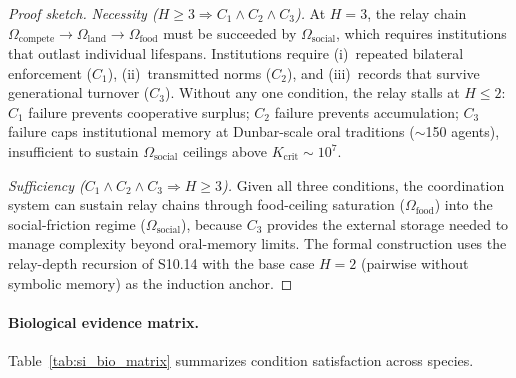 \documentclass[11pt]{article}
\begin{document}
\begin{proof}[Proof sketch]
\emph{Necessity ($H\ge 3 \Rightarrow C_1 \wedge C_2 \wedge C_3$).}
At $H=3$, the relay chain $\Omega_{\mathrm{compete}}\to\Omega_{\mathrm{land}}\to\Omega_{\mathrm{food}}$ must be succeeded by $\Omega_{\mathrm{social}}$, which requires institutions that outlast individual lifespans.
Institutions require (i)~repeated bilateral enforcement ($C_1$), (ii)~transmitted norms ($C_2$), and (iii)~records that survive generational turnover ($C_3$).
Without any one condition, the relay stalls at $H\le 2$: $C_1$ failure prevents cooperative surplus; $C_2$ failure prevents accumulation; $C_3$ failure caps institutional memory at Dunbar-scale oral traditions ($\sim$150 agents), insufficient to sustain $\Omega_{\mathrm{social}}$ ceilings above $K_{\mathrm{crit}}\sim 10^7$.

\emph{Sufficiency ($C_1 \wedge C_2 \wedge C_3 \Rightarrow H\ge 3$).}
Given all three conditions, the coordination system can sustain relay chains through food-ceiling saturation ($\Omega_{\mathrm{food}}$) into the social-friction regime ($\Omega_{\mathrm{social}}$), because $C_3$ provides the external storage needed to manage complexity beyond oral-memory limits.
The formal construction uses the relay-depth recursion of S10.14 with the base case $H=2$ (pairwise without symbolic memory) as the induction anchor.
\end{proof}

\paragraph{Biological evidence matrix.}
Table~\ref{tab:si_bio_matrix} summarizes condition satisfaction across species.
\end{document}

